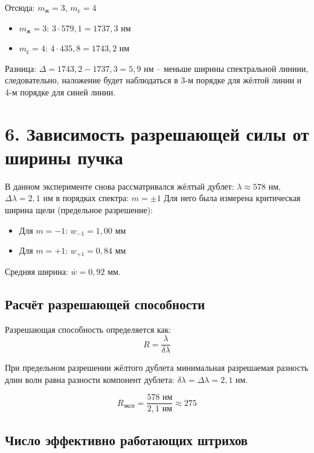 \documentclass[12pt,a4paper]{article}
\begin{document}
\noindent Отсюда: $m_{\text{ж}} = 3$, $m_{\text{с}} = 4$

\begin{itemize}
    \item $m_{\text{ж}} = 3$: $3 \cdot 579{,}1 = 1737{,}3$ нм
    \item $m_{\text{с}} = 4$: $4 \cdot 435{,}8 = 1743{,}2$ нм
\end{itemize}

\noindent Разница: $\Delta = 1743{,}2 - 1737{,}3 = 5{,}9$ нм -- меньше ширины спектральной линиии, следовательно, наложение будет наблюдаться в 3-м порядке для жёлтой линии и 4-м порядке для синей линии.





\section*{6. Зависимость разрешающей силы от ширины пучка}

В данном эксперименте снова рассматривался жёлтый дублет: $\lambda \approx 578$ нм, $\Delta\lambda = 2{,}1$ нм в порядках спектра: $m = \pm1$
Для него была измерена критическая ширина щели (предельное разрешение):
    \begin{itemize}
        \item Для $m = -1$: $w_{-1} = 1{,}00$ мм
        \item Для $m = +1$: $w_{+1} = 0{,}84$ мм
    \end{itemize}
Средняя ширина: $\overline{w} = 0{,}92$ мм.


\subsection*{Расчёт разрешающей способности}

Разрешающая способность определяется как:
\begin{equation}
    R = \frac{\lambda}{\delta\lambda}
\end{equation}

При предельном разрешении жёлтого дублета минимальная разрешаемая разность длин волн равна разности компонент дублета: $\delta\lambda = \Delta\lambda = 2{,}1$ нм.

\begin{equation}
    R_{\text{эксп}} = \frac{578\text{ нм}}{2{,}1\text{ нм}} \approx 275
\end{equation}

\subsection*{Число эффективно работающих штрихов}
\end{document}
